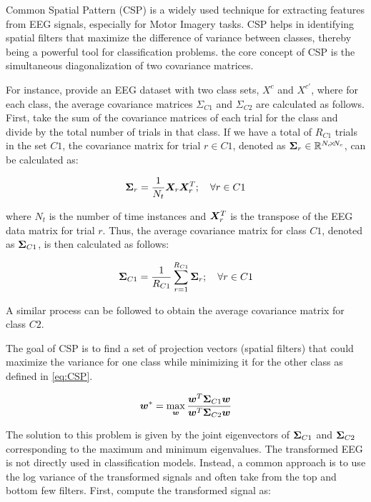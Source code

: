 Common Spatial Pattern (CSP) is a widely used technique for extracting features from EEG signals, especially for Motor Imagery tasks. CSP helps in identifying spatial filters that maximize the difference of variance between classes, thereby being a powerful tool for classification problems. the core concept of CSP is the simultaneous diagonalization of two covariance matrices. 

For instance, provide an EEG dataset with two class sets, $X^{c}$ and $X^{c'}$, where for each class, the average covariance matrices $\Sigma_{C1}$ and $\Sigma_{C2}$ are calculated as follows. First, take the sum of the covariance matrices of each trial for the class and divide by the total number of trials in that class. If we have a total of $R_{C1}$ trials in the set $C1$, the covariance matrix for trial $r \in C1$, denoted as $\bm {\Sigma}_{r} \in \mathbb{R}^{N_c \negthickspace\times\negthickspace N_c}$, can be calculated as:

\begin{equation}
\bm {\Sigma}_{r} = \frac{1}{N_{t}} \bm {X}_r \bm {X}_{r}^T;\quad \forall r \in C1
\end{equation}

where $N_{t}$ is the number of time instances and $\bm {X}_{r}^{T}$ is the transpose of the EEG data matrix for trial $r$. Thus, the average covariance matrix for class $C1$, denoted as $\bm {\Sigma}_{C1}$, is then calculated as follows:

\begin{equation}
\bm {\Sigma}_{C1} = \frac{1}{R_{C1}} \sum_{{r}=1}^{R_{C1}} \bm {\Sigma}_{r};\quad \forall r \in C1     
\end{equation}

A similar process can be followed to obtain the average covariance matrix for class $C2$.

The goal of CSP is to find a set of projection vectors (spatial filters) that could maximize the variance for one class while minimizing it for the other class as defined in \eqref{eq:CSP}.

\begin{equation}\label{eq:CSP}
\bm {w}^* = \max_{\bm {w}} \frac{\bm {w}^T \bm {\Sigma}_{C1} \bm {w}}{\bm {w}^T \bm {\Sigma}_{C2} \bm {w}}     
\end{equation}

The solution to this problem is given by the joint eigenvectors of $\bm {\Sigma}_{C1}$ and $\bm {\Sigma}_{C2}$ corresponding to the maximum and minimum eigenvalues. The transformed EEG is not directly used in classification models. Instead, a common approach is to use the log variance of the transformed signals and often take from the top and bottom few filters. First, compute the transformed signal as:

